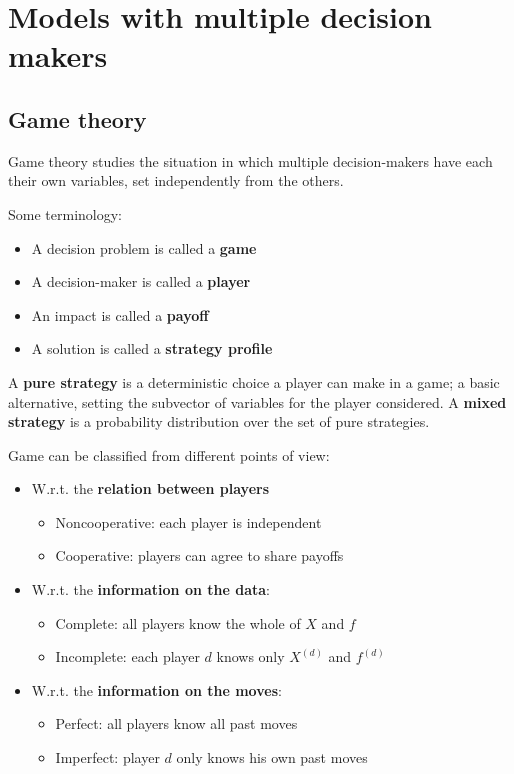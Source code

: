 \section{Models with multiple decision makers}

\subsection{Game theory}

Game theory studies the situation in which multiple decision-makers have each their own variables, set independently from the others.

Some terminology:
\begin{itemize}
	\item A decision problem is called a \textbf{game}
	
	\item A decision-maker is called a \textbf{player} 
	
	\item An impact is called a \textbf{payoff}
	
	\item A solution is called a \textbf{strategy profile}
\end{itemize}

A \textbf{pure strategy} is a deterministic choice a player can make in a game; a basic alternative, setting the subvector of variables for the player considered. A \textbf{mixed strategy} is a probability distribution over the set of pure strategies. 

Game can be classified from different points of view: 
\begin{itemize}
	\item W.r.t. the \textbf{relation between players}
	\begin{itemize}
		\item Noncooperative: each player is independent 
		
		\item Cooperative: players can agree to share payoffs
	\end{itemize}
	
	\item W.r.t. the \textbf{information on the data}:
	\begin{itemize}
		\item Complete: all players know the whole of $X$ and $f$
		
		\item Incomplete: each player $d$ knows only $X^{(d)}$ and $f^{(d)}$
	\end{itemize}
	
	\item W.r.t. the \textbf{information on the moves}:
	\begin{itemize}
		\item Perfect: all players know all past moves 
		
		\item Imperfect: player $d$ only knows his own past moves
	\end{itemize}
\end{itemize}


